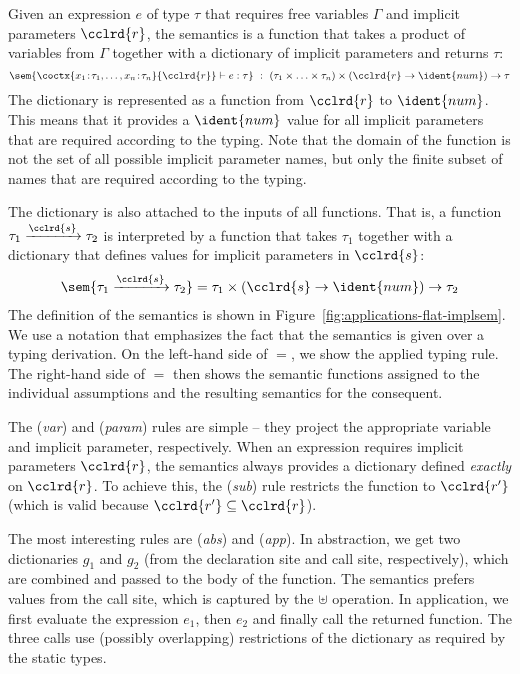 Given an expression $e$ of type $\tau$ that requires free variables $\Gamma$ and implicit parameters
$\cclrd{r}$, the semantics is a function that takes a product of variables from $\Gamma$ together
with a dictionary of implicit parameters and returns $\tau$:
%
\begin{equation*}
\sem{\coctx{x_1\!:\!\tau_1, \ldots, x_n\!:\!\tau_n}{ \cclrd{r} } \vdash e : \tau}
  ~:~ (\tau_1 \times \ldots \times \tau_n) \times (\cclrd{r} \rightarrow \ident{num}) \rightarrow \tau
\end{equation*}
%
The dictionary is represented as a function from $\cclrd{r}$ to $\ident{num}$. This means that it
provides a $\ident{num}$ value for all implicit parameters that are required according to the typing.
Note that the domain of the function is not the set of all possible implicit parameter names, but
only the finite subset of names that are required according to the typing.

The dictionary is also attached to the inputs of all functions. That is, a function $\tau_1 \xrightarrow{\cclrd{s}} \tau_2$
is interpreted by a function that takes $\tau_1$ together with a dictionary that defines values for
implicit parameters in $\cclrd{s}$:
%
\begin{equation*}
\begin{array}{l}
 \sem{\tau_1 \xrightarrow{\cclrd{s}} \tau_2} = \tau_1 \times (\cclrd{s} \rightarrow \ident{num}) \rightarrow \tau_2
\end{array}
\end{equation*}
%
The definition of the semantics is shown in Figure~\ref{fig:applications-flat-implsem}. We use a
notation that emphasizes the fact that the semantics is given over a typing derivation. On the
left-hand side of $=$, we show the applied typing rule. The right-hand side of $=$ then shows the
semantic functions assigned to the individual assumptions and the resulting semantics for the
consequent.

The (\emph{var}) and (\emph{param}) rules are simple -- they project the appropriate variable and
implicit parameter, respectively. When an expression requires implicit parameters $\cclrd{r}$, the
semantics always provides a dictionary defined \emph{exactly} on $\cclrd{r}$. To achieve this, the
(\emph{sub}) rule restricts the function to $\cclrd{r'}$ (which is valid because $\cclrd{r'} \subseteq \cclrd{r}$).

The most interesting rules are (\emph{abs}) and (\emph{app}). In abstraction, we get two dictionaries
$g_1$ and $g_2$ (from the declaration site and call site, respectively), which are combined and passed
to the body of the function. The semantics prefers values from the call site, which is captured by
the $\uplus$ operation. In application, we first evaluate the expression $e_1$, then $e_2$ and finally
call the returned function. The three calls use (possibly overlapping) restrictions of the dictionary
as required by the static types.

